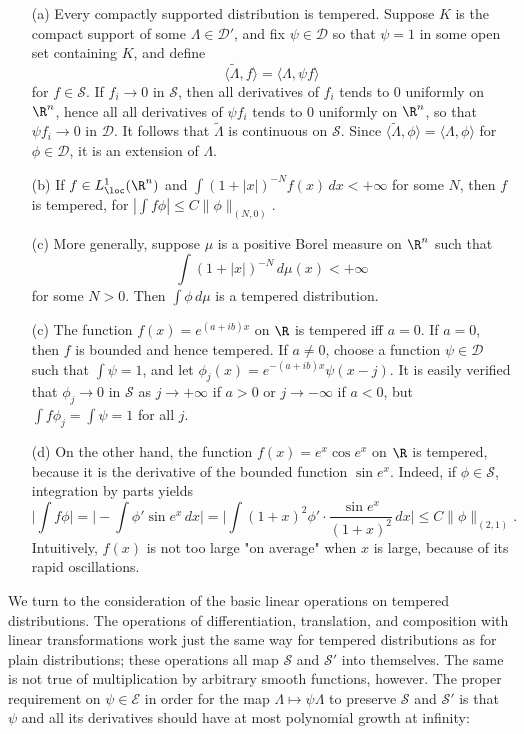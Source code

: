 \begin{example}\label{tempered distribution eg}
\mbox{}
\begin{itemize}
\item[(a)] Every compactly supported distribution is tempered. Suppose $K$ is the compact support of some $\Lambda\in\mathscr{D}'$, and fix $\psi\in\mathscr{D}$ so that $\psi=1$ in some open set containing $K$, and define
\[\langle\widetilde{\Lambda},f\rangle=\langle\Lambda,\psi f\rangle\]
for $f\in\mathscr{S}$. If $f_i\to 0$ in $\mathscr{S}$, then all derivatives of $f_i$ tends to $0$ uniformly on $\R^n$, hence all all derivatives of $\psi f_i$ tends to $0$ uniformly on $\R^n$, so that $\psi f_i\to 0$ in $\mathscr{D}$. It follows that $\widetilde{\Lambda}$ is continuous on $\mathscr{S}$. Since $\langle\widetilde{\Lambda},\phi\rangle=\langle\Lambda,\phi\rangle$ for $\phi\in\mathscr{D}$, it is an extension of $\Lambda$. 
\item[(b)] If $f\in L^1_{\loc}(\R^n)$ and $\int(1+|x|)^{-N}f(x)\,dx<+\infty$ for some $N$, then $f$ is tempered, for $|\int f\phi|\leq C\|\phi\|_{(N,0)}$.
\item[(c)] More generally, suppose $\mu$ is a positive Borel measure on $\R^n$ such that 
\[\int(1+|x|)^{-N}\,d\mu(x)<+\infty\]
for some $N>0$. Then $\int\phi\,d\mu$ is a tempered distribution.
\item[(c)] The function $f(x)=e^{(a+ib)x}$ on $\R$ is tempered iff $a=0$. If $a=0$, then $f$ is bounded and hence tempered. If $a\neq 0$, choose a function $\psi\in\mathscr{D}$ such that $\int\psi=1$, and let $\phi_j(x)=e^{-(a+ib)x}\psi(x-j)$. It is easily verified that $\phi_j\to 0$ in $\mathscr{S}$ as $j\to+\infty$ if $a>0$ or $j\to-\infty$ if $a<0$, but $\int f\phi_j=\int\psi=1$ for all $j$.
\item[(d)] On the other hand, the function $f(x)=e^x\cos e^x$ on $\R$ is tempered, because it is the derivative of the bounded function $\sin e^x$. Indeed, if $\phi\in\mathscr{S}$, integration by parts yields
\[\Big|\int f\phi\Big|=\Big|-\int\phi'\sin e^x\,dx\Big|=\Big|\int(1+x)^2\phi'\cdot\frac{\sin e^x}{(1+x)^2}\,dx\Big|\leq C\|\phi\|_{(2,1)}.\]
Intuitively, $f(x)$ is not too large "on average" when $x$ is large, because of its rapid oscillations.  
\end{itemize}
\end{example}
We turn to the consideration of the basic linear operations on tempered distributions. The operations of differentiation, translation, and composition with linear transformations work just the same way for tempered distributions as for plain distributions; these operations all map $\mathscr{S}$ and $\mathscr{S}'$ into themselves. The same is not true of multiplication by arbitrary smooth functions, however. The proper requirement on $\psi\in \mathscr{E}$ in order for the map $\Lambda\mapsto\psi\Lambda$ to preserve $\mathscr{S}$ and $\mathscr{S}'$ is that $\psi$ and all its derivatives should have at most polynomial growth at infinity:

